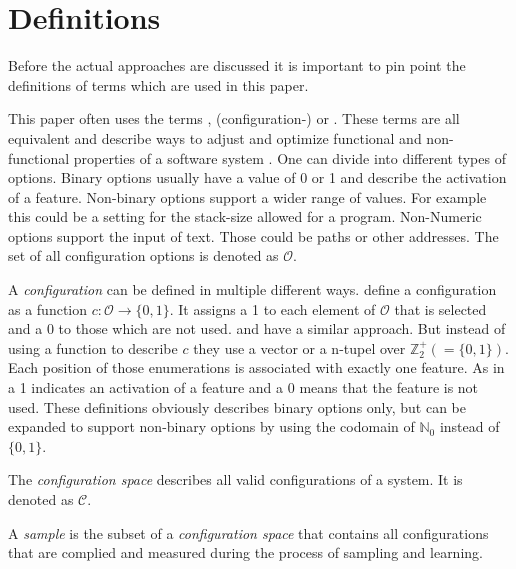 \section{Definitions}

Before the actual approaches are discussed it is important to pin point the definitions of terms which are used in this paper.

This paper often uses the terms , (configuration-) or . These terms are all equivalent and describe ways to adjust and optimize functional and non-functional properties of a software system \cite{DistanceBasedSampling2019}.
One can divide into different types of options. Binary options usually have a value of 0 or 1 and describe the activation of a feature. Non-binary options support a wider range of values. For example this could be a setting for the stack-size allowed for a program. Non-Numeric options support the input of text. Those could be paths or other addresses.
The set of all configuration options is denoted as $\mathcal{O}$.


A \textit{configuration} can be defined in multiple different ways. \citet{DistanceBasedSampling2019} define a configuration as a function $c : \mathcal{O} \rightarrow \{0,1\}$. It assigns a 1 to each element of $\mathcal{O}$ that is selected and a 0 to those which are not used.
\citet{FasterDiscoveryofFasterSystemConfigurationsSiegmund2017} and \cite{VariabilityAwarePerformancePredictionJianmeiSigmundApel} have a similar approach. But instead of using a function to describe $c$ they use a vector or a n-tupel over $\mathbb{Z}^+_2(= \{0,1\})$. Each position of those enumerations is associated with exactly one feature. As in \cite{DistanceBasedSampling2019} a 1 indicates an activation of a feature and a 0 means that the feature is not used. These definitions obviously describes binary options only, but can be expanded to support non-binary options by using the codomain of $\mathbb{N}_0$ instead of $\{0,1\}$.

The \textit{configuration space} describes all valid configurations of a system. It is denoted as $\mathcal{C}$.

A \textit{sample} is the subset of a \textit{configuration space} that contains all configurations that are complied and measured during the process of sampling and learning.

